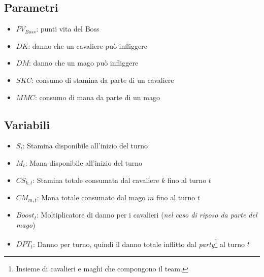 \documentclass[12pt]{article}
\begin{document}
    \subsection{Parametri}
    \begin{itemize}
        \item $PV_{Boss}$: punti vita del Boss
        \item $DK$: danno che un cavaliere può infliggere
        \item $DM$: danno che un mago può infliggere
        \item $SKC$: consumo di stamina da parte di un cavaliere
        \item $MMC$: consumo di mana da parte di un mago
    \end{itemize}
   \subsection{Variabili}
   \begin{itemize}
    \item $S_t$: Stamina disponibile all'inizio del turno
    \item $M_t$: Mana disponibile all'inizio del turno
    \item $CS_{k,t}$: Stamina totale consumata dal cavaliere $k$ fino al turno $t$
    \item $CM_{m,t}$: Mana totale consumato dal mago $m$ fino al turno $t$
    \item $Boost_t$: Moltiplicatore di danno per i cavalieri (\textit{nel caso di riposo da parte del mago})
    \item $DPT_t$: Danno per turno, quindi il danno totale inflitto dal \textit{party}\footnote{Insieme di cavalieri e maghi che compongono il team.} al turno $t$
   \end{itemize}
\end{document}
